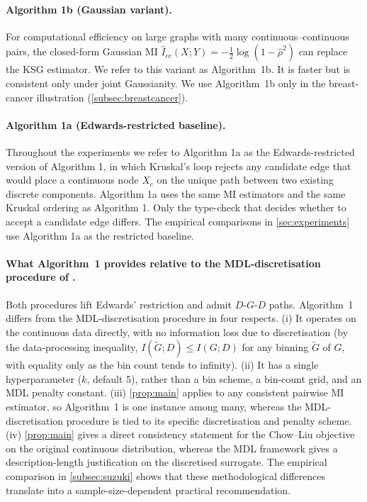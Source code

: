 \paragraph{Algorithm 1b (Gaussian variant).} For computational
efficiency on large graphs with many continuous--continuous pairs,
the closed-form Gaussian MI $\hat{I}_{cc}(X; Y) = -\tfrac{1}{2}\log(1
- \hat{\rho}^2)$ can replace the KSG estimator. We refer to this
variant as Algorithm~1b. It is faster but is consistent only under
joint Gaussianity. We use Algorithm~1b only in the breast-cancer
illustration (\cref{subsec:breastcancer}).

\paragraph{Algorithm 1a (Edwards-restricted baseline).} Throughout
the experiments we refer to Algorithm 1a as the Edwards-restricted
version of Algorithm 1, in which Kruskal's loop rejects any
candidate edge that would place a continuous node $X_c$ on the
unique path between two existing discrete components. Algorithm 1a
uses the same MI estimators and the same Kruskal ordering as
Algorithm 1. Only the type-check that decides whether to accept a
candidate edge differs. The empirical comparisons in
\cref{sec:experiments} use Algorithm 1a as the restricted baseline.

\paragraph{What Algorithm~1 provides relative to the
MDL-discretisation procedure of \citet{suzuki2017chow}.} Both
procedures lift Edwards' restriction and admit $D$-$G$-$D$ paths.
Algorithm~1 differs from the MDL-discretisation procedure in four
respects.
(i) It operates on the continuous data directly, with no information
loss due to discretisation (by the data-processing inequality,
$I(\tilde{G}; D) \le I(G; D)$ for any binning $\tilde{G}$ of $G$, with
equality only as the bin count tends to infinity).
(ii) It has a single hyperparameter ($k$, default 5), rather than a
bin scheme, a bin-count grid, and an MDL penalty constant.
(iii) \cref{prop:main} applies to any consistent pairwise MI
estimator, so Algorithm~1 is one instance among many, whereas the
MDL-discretisation procedure is tied to its specific discretisation
and penalty scheme.
(iv) \cref{prop:main} gives a direct consistency statement
for the Chow--Liu objective on the original continuous distribution,
whereas the MDL framework gives a description-length justification on
the discretised surrogate. The empirical comparison in
\cref{subsec:suzuki} shows that these methodological
differences translate into a sample-size-dependent practical
recommendation.

